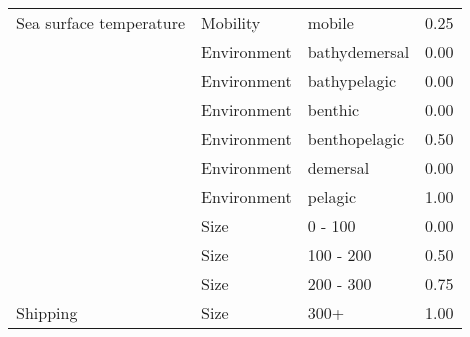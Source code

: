 \documentclass[
  12pt,
]{article}
\begin{document}
\begin{longtable}{llll}
\cmidrule{2-4}
\multirow{-11}{*}{\raggedright\arraybackslash Sea surface temperature} & Mobility & mobile & 0.25\\
\cmidrule{1-4}
 & Environment & bathydemersal & 0.00\\
\cmidrule{2-4}
 & Environment & bathypelagic & 0.00\\
\cmidrule{2-4}
 & Environment & benthic & 0.00\\
\cmidrule{2-4}
 & Environment & benthopelagic & 0.50\\
\cmidrule{2-4}
 & Environment & demersal & 0.00\\
\cmidrule{2-4}
 & Environment & pelagic & 1.00\\
\cmidrule{2-4}
 & Size & 0 - 100 & 0.00\\
\cmidrule{2-4}
 & Size & 100 - 200 & 0.50\\
\cmidrule{2-4}
 & Size & 200 - 300 & 0.75\\
\cmidrule{2-4}
\multirow{-10}{*}{\raggedright\arraybackslash Shipping} & Size & 300+ & 1.00\\*
\end{longtable}
\end{document}
